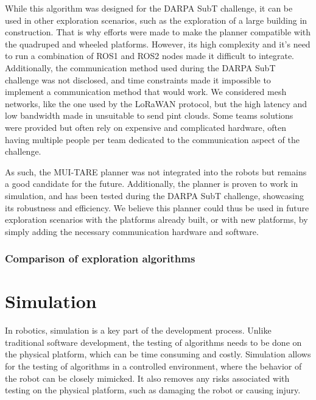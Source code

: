 \documentclass[12pt]{article}
\begin{document}
        While this algorithm was designed for the DARPA SubT challenge, it can be used in other exploration scenarios, such as the exploration of a large building in construction. That is why efforts were made to make the planner compatible with the quadruped and wheeled platforms. However, its high complexity and it's need to run a combination of ROS1 and ROS2 nodes made it difficult to integrate. Additionally, the communication method used during the DARPA SubT challenge was not disclosed, and time constraints made it impossible to implement a communication method that would work. We considered mesh networks, like the one used by the LoRaWAN \cite{rahman2020lorawan} protocol, but the high latency and low bandwidth made in unsuitable to send pint clouds. Some teams solutions were provided \cite{roucek2021system} but often rely on expensive and complicated hardware, often having multiple people per team dedicated to the communication aspect of the challenge.

        As such, the MUI-TARE planner was not integrated into the robots but remains a good candidate for the future. Additionally, the planner is proven to work in simulation, and has been tested during the DARPA SubT challenge, showcasing its robustness and efficiency. We believe this planner could thus be used in future exploration scenarios with the platforms already built, or with new platforms, by simply adding the necessary communication hardware and software. 


        \subsubsection{Comparison of exploration algorithms}


    
\newpage
\section{Simulation}

    In robotics, simulation is a key part of the development process. Unlike traditional software development, the testing of algorithms needs to be done on the physical platform, which can be time consuming and costly. Simulation allows for the testing of algorithms in a controlled environment, where the behavior of the robot can be closely mimicked. It also removes any risks associated with testing on the physical platform, such as damaging the robot or causing injury. 
\end{document}
